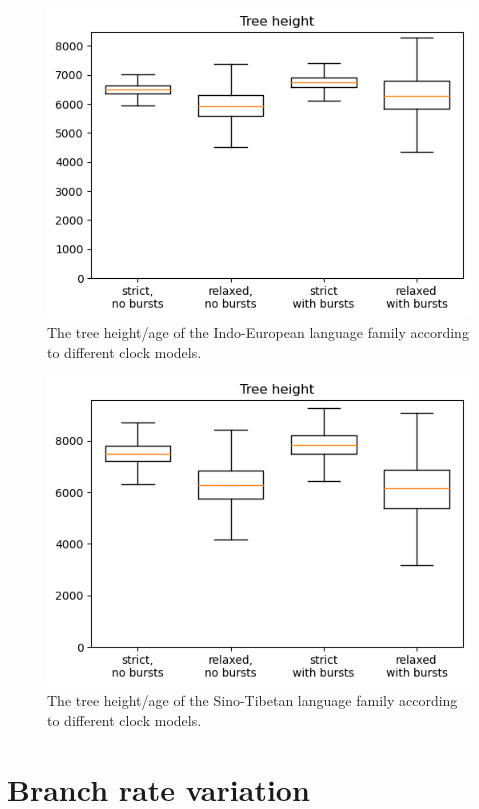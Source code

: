 \documentclass[a4paper]{article}
\begin{document}
\begin{figure}
    \centering
    \includegraphics{supplement/analysis/indoeuropean_treeheight.png}
    \caption{The tree height/age of the Indo-European language family according to different clock models.}
    \label{fig:tree_height:indoeuropean}
\end{figure}

\begin{figure}
    \centering
    \includegraphics{supplement/analysis/sinotibetan_treeheight.png}
    \caption{The tree height/age of the Sino-Tibetan language family according to different clock models.}
    \label{fig:tree_height:sinotibetan}
\end{figure}


\section{Branch rate variation}
\end{document}
